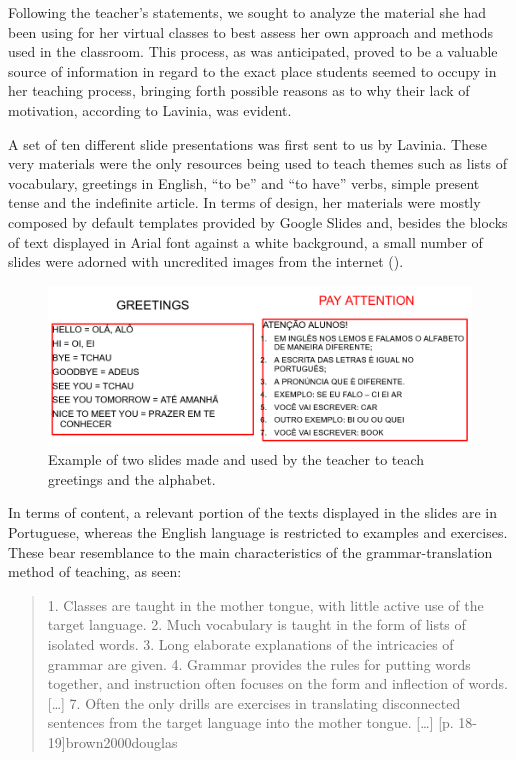 \documentclass[english]{textolivre}
\begin{document}
Following the teacher’s statements, we sought to analyze the material she had been using for her virtual classes to best assess her own approach and methods used in the classroom. This process, as was anticipated, proved to be a valuable source of information in regard to the exact place students seemed to occupy in her teaching process, bringing forth possible reasons as to why their lack of motivation, according to Lavinia, was evident.

A set of ten different slide presentations was first sent to us by Lavinia. These very materials were the only resources being used to teach themes such as lists of vocabulary, greetings in English, “to be” and “to have” verbs, simple present tense and the indefinite article. In terms of design, her materials were mostly composed by default templates provided by Google Slides and, besides the blocks of text displayed in Arial font against a white background, a small number of slides were adorned with uncredited images from the internet ().

\begin{figure}[htbp]
\centering
\begin{minipage}{.8\textwidth}
 \includegraphics[width=\textwidth]{Fig1.png}
 \caption{Example of two slides made and used by the teacher to teach greetings and the alphabet.}
 \label{fig01}
\end{minipage}
\end{figure}

In terms of content, a relevant portion of the texts displayed in the slides are in Portuguese, whereas the English language is restricted to examples and exercises. These bear resemblance to the main characteristics of the grammar-translation method \cite{brown2006principles, harmer2007practice, richards2014approaches} of teaching, as seen:

\begin{quote}
1. Classes are taught in the mother tongue, with little active use of the target language.
2. Much vocabulary is taught in the form of lists of isolated words.
3. Long elaborate explanations of the intricacies of grammar are given.
4. Grammar provides the rules for putting words together, and instruction often focuses on the form and inflection of words. […] 7. Often the only drills are exercises in translating disconnected sentences from the target language into the mother tongue. […] [p. 18-19]{brown2000douglas}

\end{quote}
\end{document}

